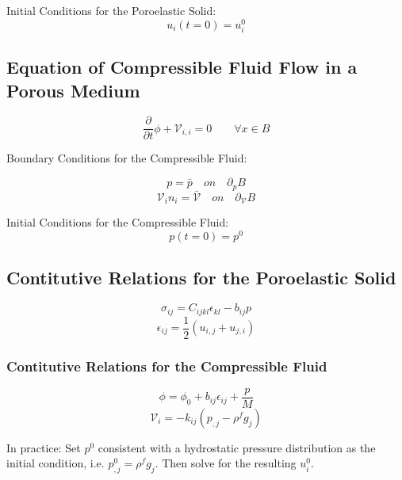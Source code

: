 \documentclass[11pt]{article} %
\begin{document}
Initial Conditions for the Poroelastic Solid:
\begin{equation}
	u_i (t=0) = u_i^0
\end{equation}

\subsection{Equation of Compressible Fluid Flow in a Porous Medium}

\begin{equation}
	\frac{\partial}{\partial t} \phi + \mathcal{V}_{i,i} = 0 \qquad \forall x \in B
\end{equation}

Boundary Conditions for the Compressible Fluid:

\begin{equation}
	p = \bar{p} \quad on \quad \partial_p B
\end{equation}
\begin{equation}
	\mathcal{V}_i n_i = \bar{\mathcal{V}} \quad on \quad \partial_{\mathcal{V}} B
\end{equation}

Initial Conditions for the Compressible Fluid:
\begin{equation}
	p (t=0) = p^0
\end{equation}

\subsection{Contitutive Relations for the Poroelastic Solid}
\begin{equation}
	\sigma_{ij} = C_{ijkl} \epsilon_{kl} - b_{ij} p
\end{equation}
\begin{equation}
	\epsilon_{ij} = \frac{1}{2} (u_{i,j}+u_{j,i})
\end{equation}

\subsubsection{Contitutive Relations for the Compressible Fluid}
\begin{equation}
	\phi = \phi_0 + b_{ij} \epsilon_{ij} + \frac{p}{M}
\end{equation}
\begin{equation}
	\mathcal{V}_i = -k_{ij} ( p_{,j} - \rho^f g_j )
\end{equation}

In practice: Set $p^0$ consistent with a hydrostatic pressure distribution as the initial condition, i.e. $p_{,j}^0 = \rho^f g_j$. Then solve for the resulting $u_i^0$.
\end{document}
